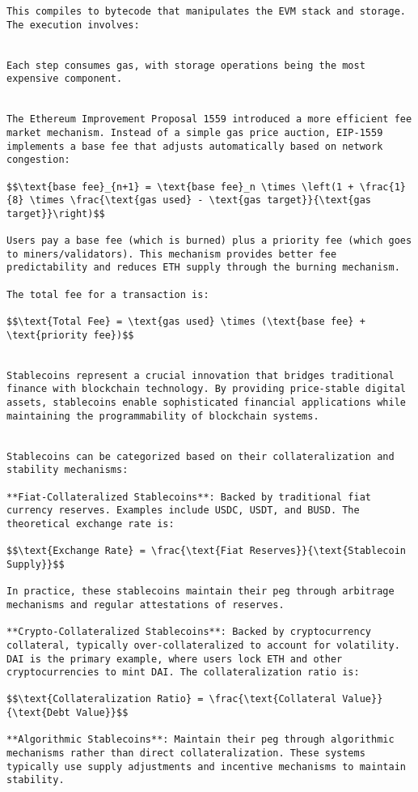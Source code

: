 \documentclass[12pt]{article}
\begin{document}
{{{\begin{itemize}
\begin{lstlisting}
This compiles to bytecode that manipulates the EVM stack and storage. The execution involves:


Each step consumes gas, with storage operations being the most expensive component.


The Ethereum Improvement Proposal 1559 introduced a more efficient fee market mechanism. Instead of a simple gas price auction, EIP-1559 implements a base fee that adjusts automatically based on network congestion:

$$\text{base fee}_{n+1} = \text{base fee}_n \times \left(1 + \frac{1}{8} \times \frac{\text{gas used} - \text{gas target}}{\text{gas target}}\right)$$

Users pay a base fee (which is burned) plus a priority fee (which goes to miners/validators). This mechanism provides better fee predictability and reduces ETH supply through the burning mechanism.

The total fee for a transaction is:

$$\text{Total Fee} = \text{gas used} \times (\text{base fee} + \text{priority fee})$$


Stablecoins represent a crucial innovation that bridges traditional finance with blockchain technology. By providing price-stable digital assets, stablecoins enable sophisticated financial applications while maintaining the programmability of blockchain systems.


Stablecoins can be categorized based on their collateralization and stability mechanisms:

**Fiat-Collateralized Stablecoins**: Backed by traditional fiat currency reserves. Examples include USDC, USDT, and BUSD. The theoretical exchange rate is:

$$\text{Exchange Rate} = \frac{\text{Fiat Reserves}}{\text{Stablecoin Supply}}$$

In practice, these stablecoins maintain their peg through arbitrage mechanisms and regular attestations of reserves.

**Crypto-Collateralized Stablecoins**: Backed by cryptocurrency collateral, typically over-collateralized to account for volatility. DAI is the primary example, where users lock ETH and other cryptocurrencies to mint DAI. The collateralization ratio is:

$$\text{Collateralization Ratio} = \frac{\text{Collateral Value}}{\text{Debt Value}}$$

**Algorithmic Stablecoins**: Maintain their peg through algorithmic mechanisms rather than direct collateralization. These systems typically use supply adjustments and incentive mechanisms to maintain stability.



\end{lstlisting}
\end{itemize}}}}
\end{document}
